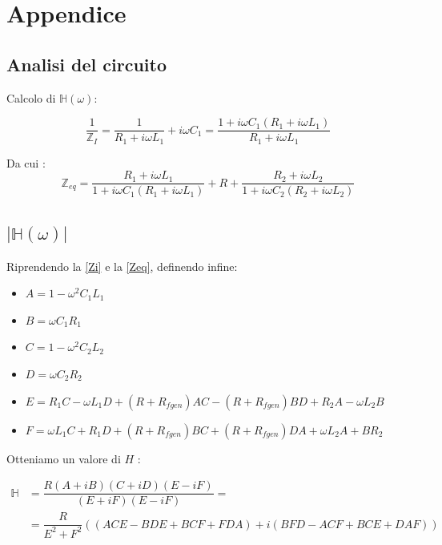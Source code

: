 \documentclass[leqno]{article}
\begin{document}
	\setcounter{section}{0}
	\renewcommand{\thesection}{\Alph{section}}
	\section{Appendice}
	\subsection{Analisi del circuito}
	
	
	Calcolo di $\mathbb{H}( \omega)$:
	
	\begin{equation}
		\dfrac{1}{\mathbb{Z}_I}= \dfrac{1}{R_1+i\omega L_1} + i \omega C_1 = \dfrac{1 + i \omega C_1 (R_1 + i \omega L_1)}{R_1 + i \omega L_1}
		\label{Zi}
	\end{equation}
	
	Da cui : 
	\begin{equation}
		\mathbb{Z}_{eq} = \dfrac{R_1 + i \omega L_1}{1 + i \omega C_1 (R_1 + i \omega L_1)} + R + \dfrac{R_2 + i \omega L_2}{1 + i \omega C_2 (R_2 + i \omega L_2)} 
		\label{Zeq}
	\end{equation}
	\subsection{$|\mathbb{H}(\omega)|$ }
	
	Riprendendo la \eqref{Zi} e la \eqref{Zeq}, definendo infine: 
	
	
	\begin{itemize}
		\item $A =  1- \omega^2 C_1 L_1 $
		\item $B = \omega C_1 R_1 $
		\item $C = 1- \omega^2 C_2 L_2$
		\item $D = \omega C_2 R_2$
		\item $E = R_1 C - \omega L_1 D +(R+R_{fgen})AC - (R+R_{fgen})BD + R_2A - \omega L_2 B$
		\item $F = \omega L_1 C + R_1 D + (R+R_{fgen})BC + (R+R_{fgen})DA + \omega L_2 A + B R_2$
	\end{itemize}
	Otteniamo un valore di $H $ : 
	
	\begin{equation}
		\begin{aligned}
			\mathbb{H} & = \dfrac{R(A+ i B)(C+iD)(E-iF)}{(E + iF)(E - iF)} = \\
			& =\dfrac{R }{E^2 + F^2} \left( (ACE - BDE + BCF + FDA) + i ( BFD - ACF + BCE +DAF )\right)
		\end{aligned}
	\end{equation}
	\vspace{0.5cm}
	
\end{document}
